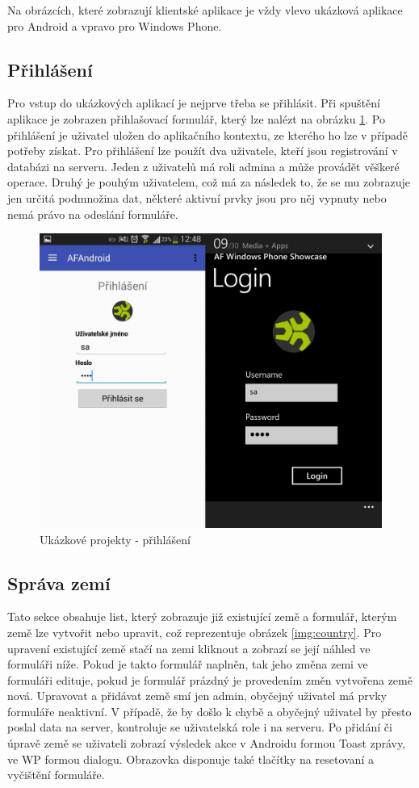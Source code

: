 Na obrázcích, které zobrazují klientské aplikace je vždy vlevo ukázková aplikace pro Android a vpravo pro Windows Phone.

\subsection{Přihlášení}
Pro vstup do ukázkových aplikací je nejprve třeba se přihlásit. Při spuštění aplikace je zobrazen přihlašovací formulář, který lze nalézt na obrázku \ref{img:login}. Po přihlášení je uživatel uložen do aplikačního kontextu, ze kterého ho lze v případě potřeby získat. Pro přihlášení lze použít dva uživatele, kteří jsou registrování v databázi na serveru. Jeden z uživatelů má roli admina a může provádět věškeré operace. Druhý je pouhým uživatelem, což má za následek to, že se mu zobrazuje jen určitá podmnožina dat, některé aktivní prvky jsou pro něj vypnuty nebo nemá právo na odeslání formuláře.

\begin{figure}[h!]
\centering
\includegraphics[width=0.5\linewidth]{figures/screenshots/Login}
\caption{Ukázkové projekty - přihlášení}  
\label{img:login}
\end{figure}

\subsection{Správa zemí}
Tato sekce obsahuje list, který zobrazuje již existující země a formulář, kterým země lze vytvořit nebo upravit, což reprezentuje obrázek \ref{img:country}. Pro upravení existující země stačí na zemi kliknout a zobrazí se její náhled ve formuláři níže. Pokud je takto formulář naplněn, tak jeho změna zemi ve formuláři edituje, pokud je formulář prázdný je provedením změn vytvořena země nová. Upravovat a přidávat země smí jen admin, obyčejný uživatel má prvky formuláře neaktivní. V případě, že by došlo k chybě a obyčejný uživatel by přesto poslal data na server, kontroluje se uživatelská role i na serveru. Po přidání či úpravě země se uživateli zobrazí výsledek akce v Androidu formou Toast zprávy, ve WP formou dialogu. Obrazovka disponuje také tlačítky na resetovaní a vyčištění formuláře.
